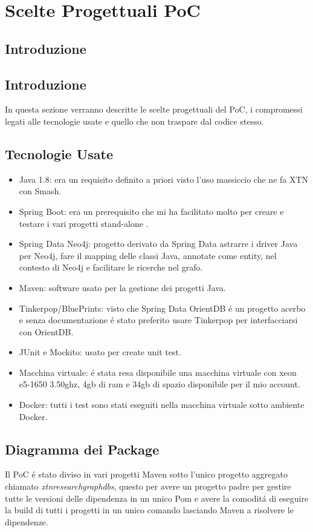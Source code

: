 \section{Scelte Progettuali PoC}
\subsection{Introduzione}



\subsection{Introduzione}
In questa sezione verranno descritte le scelte progettuali del PoC, i compromessi legati alle tecnologie usate e quello che non traspare dal codice stesso.



\subsection{Tecnologie Usate}
\begin{itemize}
\item{Java 1.8:} era un requisito definito a priori visto l'uso massiccio che ne fa XTN con Smash.
\item{Spring Boot:} era un prerequisito che mi ha facilitato molto per creare e testare i vari progetti stand-alone .
\item{Spring Data Neo4j:} progetto derivato da Spring Data astrarre i driver Java per Neo4j, fare il mapping delle classi Java, annotate come entity, nel contesto di Neo4j e facilitare le ricerche nel grafo.
\item{Maven:} software usato per la gestione dei progetti Java.
\item{Tinkerpop/BluePrints:} visto che Spring Data OrientDB \'e un progetto acerbo e senza documentazione \'e stato preferito usare Tinkerpop per interfacciarsi con OrientDB.
\item{JUnit e Mockito:} usato per create unit test.
\item{Macchina virtuale:} \'e stata resa disponibile una macchina virtuale con xeon e5-1650 3.50ghz, 4gb di ram e 34gb di spazio disponibile per il mio account.
\item{Docker:} tutti i test sono stati eseguiti nella macchina virtuale sotto ambiente Docker.
\end{itemize}
\newpage
\subsection{Diagramma dei Package}
Il PoC \'e stato diviso in vari progetti Maven sotto l'unico progetto aggregato chiamato \textit{xtn\textunderscore research\textunderscore graphdbs}, questo per avere un progetto padre per gestire tutte le versioni delle dipendenza in un unico Pom e avere la comodit\'a di eseguire la build di tutti i progetti in un unico comando lasciando Maven a risolvere le dipendenze.


